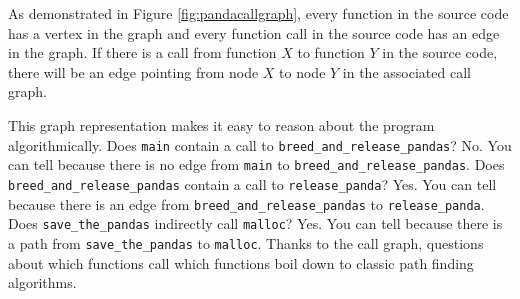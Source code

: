 As demonstrated in Figure \ref{fig:pandacallgraph}, every function in the source code has a vertex in the graph and every function call in the source code has an edge in the graph.  If there is a call from function $X$ to function $Y$ in the source code, there will be an edge pointing from node $X$ to node $Y$ in the associated call graph. 

\begin{sloppypar}
This graph representation makes it easy to reason about the program algorithmically.  Does \lstinline{main} contain a call to \lstinline{breed_and_release_pandas}?  No.  You can tell because there is no edge from \lstinline{main} to \lstinline{breed_and_release_pandas}.  Does \lstinline{breed_and_release_pandas} contain a call to \lstinline{release_panda}?  Yes.  You can tell because there is an edge from \lstinline{breed_and_release_pandas} to \lstinline{release_panda}.  Does \lstinline{save_the_pandas} indirectly call \lstinline{malloc}?  Yes.  You can tell because there is a path from \lstinline{save_the_pandas} to \lstinline{malloc}.  Thanks to the call graph, questions about which functions call which functions boil down to classic path finding algorithms.  
\end{sloppypar}
